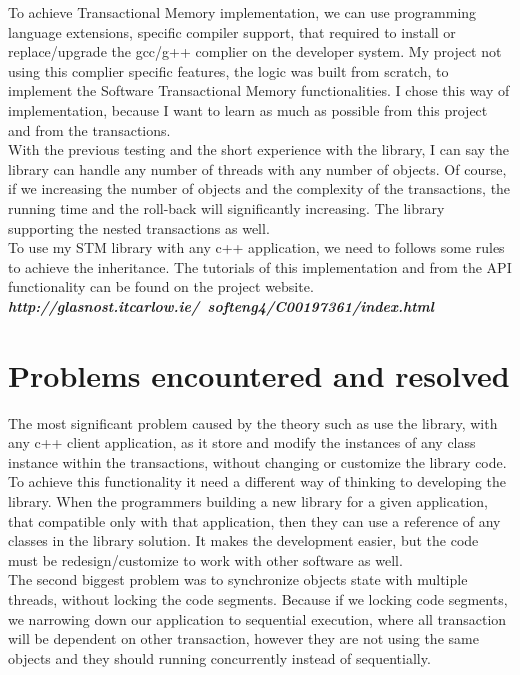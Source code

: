 \documentclass[12pt]{article}
\begin{document}
To achieve Transactional Memory implementation, we can use programming language extensions, specific compiler support, that required to install or replace/upgrade the gcc/g++ complier on the developer system. My project not using this complier specific features, the logic was built from scratch, to implement the Software Transactional Memory functionalities. I chose this way of implementation, because I want to learn as much as possible from this project and from the transactions.\\
 
With the previous testing and the short experience with the library, I can say the library can handle any number of threads with any number of objects. Of course, if we increasing the number of objects and the complexity of the transactions, the running time and the roll-back will significantly increasing. The library supporting the nested transactions as well.\\

To use my STM library with any c++ application, we need to follows some rules to achieve the inheritance. The tutorials of this implementation and from the API functionality can be found on the project website.\textbf{ \textit{http://glasnost.itcarlow.ie/~softeng4/C00197361/index.html}}


\section{Problems encountered and resolved}
The most significant problem caused by the theory such as use the library, with any c++ client application, as it store and modify the instances of any class instance within the transactions, without changing or customize the library code. To achieve this functionality it need a different way of thinking to developing the library. When the programmers building a new library for a given application, that compatible only with that application, then they can use a reference of any classes in the library solution. It makes the development easier, but the code must be redesign/customize to work with other software as well.\\

The second biggest problem was to synchronize objects state with multiple threads, without locking the code segments. Because if we locking code segments, we narrowing down our application to sequential execution, where all transaction will be dependent on other transaction, however they are not using the same objects and they should running concurrently instead of sequentially.\\
\end{document}
